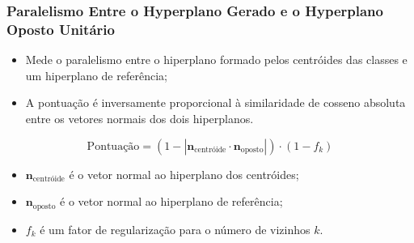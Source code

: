 \begin{frame}

    \frametitle{Paralelismo Entre o Hyperplano Gerado e o Hyperplano Oposto Unitário}

    \begin{itemize}
        \item Mede o paralelismo entre o hiperplano formado pelos centróides das classes e um hiperplano de referência;
        \item A pontuação é inversamente proporcional à similaridade de cosseno absoluta entre os vetores normais dos dois hiperplanos.
    \end{itemize}

    \begin{equation}
        \text{Pontuação} = (1 - |\mathbf{n}_{\text{centróide}} \cdot \mathbf{n}_{\text{oposto}}|) \cdot (1 - f_k)
    \end{equation}

    \begin{itemize}
        \item $\mathbf{n}_{\text{centróide}}$ é o vetor normal ao hiperplano dos centróides;
        \item $\mathbf{n}_{\text{oposto}}$ é o vetor normal ao hiperplano de referência;
        \item $f_k$ é um fator de regularização para o número de vizinhos $k$.
    \end{itemize}

\end{frame}